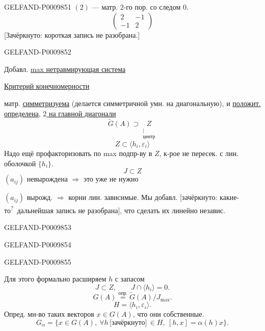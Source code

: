 \begin{GelfandAdjacentEvidence}{GELFAND-P000985}{1}
$(2)$ --- матр. 2-го пор. со следом $0$.
\[
\begin{pmatrix}2&-1\\-1&2\end{pmatrix}
\]
[Зачёркнуто: короткая запись не разобрана.]
\end{GelfandAdjacentEvidence}
\begin{GelfandAdjacentEvidence}{GELFAND-P000985}{2}


Добавл. \underline{max нетравмирующая система}

\underline{Критерий конечномерности}

матр. \underline{симметризуема} (делается симметричной умн. на диагональную), и \underline{положит. определена}, \underline{$2$ на главной диагонали}
\[
\widetilde G(A)\supset\underset{\substack{\vert\\\text{центр}}}{Z}
\]
\[
Z\subset\langle h_i,\varepsilon_i\rangle
\]
Надо ещё профакторизовать по max подпр-ву в $Z$, к-рое не пересек. с лин. оболочкой $\{h_i\}$.
\[
J\subset Z
\]
$(a_{ij})$ невырождена $\Rightarrow$ это уже не нужно

$(a_{ij})$ вырожд. $\Rightarrow$ корни лин. зависимые.
Мы добавл. [зачёркнуто: какие-то\textsuperscript{?}\ дальнейшая запись не разобрана], что сделать их линейно независ.
\end{GelfandAdjacentEvidence}
\begin{GelfandAdjacentEvidence}{GELFAND-P000985}{3}

\end{GelfandAdjacentEvidence}
\begin{GelfandAdjacentEvidence}{GELFAND-P000985}{4}

\end{GelfandAdjacentEvidence}
\begin{GelfandAdjacentEvidence}{GELFAND-P000985}{5}


Для этого формально расширяем $h$ с запасом
\[
J\subset Z,\qquad J\cap\langle h_i\rangle=0.
\]
\[
G(A)\overset{\text{опр.}}{=}\widetilde G(A)/J_{\max}.
\]
\[
H=\langle h_i,\varepsilon_i\rangle.
\]
Опред. мн-во таких векторов $x\in G(A)$, что они собственные.
\[
G_\alpha=\{x\in G(A),\ \forall h\,\text{[зачёркнуто]}\,\in H,\ [h,x]=\alpha(h)x\}.
\]
\end{GelfandAdjacentEvidence}
